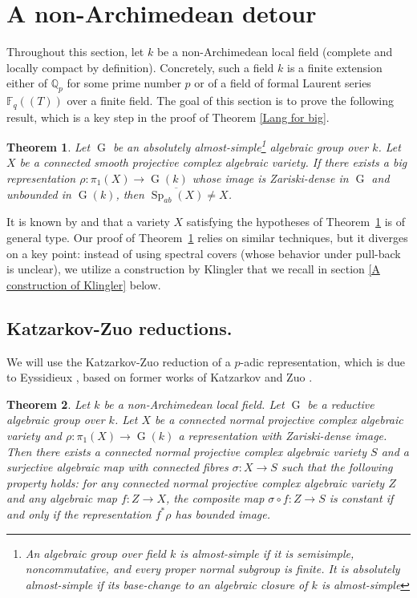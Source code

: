 \documentclass[11pt,letterpaper]{amsart}
\def\bQ{\mathbb{Q}}
\theoremstyle{plain}
\newtheorem{thm}{Theorem}[section]
\DeclareMathOperator{\Sp}{Sp}
\DeclareMathOperator{\rG}{G}
\begin{document}
\section{A non-Archimedean detour}

Throughout this section, let $k$ be a non-Archimedean local field (complete and locally compact by definition). Concretely, such a field $k$ is a finite extension either of $\bQ_p$ for some prime number $p$ or of a field of formal Laurent series $\mathbb{F}_q((T))$ over a finite field. The goal of this section is to prove the following result, which is a key step in the proof of Theorem \ref{Lang for big}.


\begin{thm}\label{non-Archimedean key}
Let $\rG$ be an absolutely almost-simple\footnote{An algebraic group over field $k$ is almost-simple if it is semisimple, noncommutative, and every proper normal subgroup is finite. It is absolutely almost-simple if its base-change to an algebraic closure of $k$ is almost-simple} algebraic group over $k$. Let $X$ be a connected smooth projective complex algebraic variety. If there exists a big representation $\rho \colon \pi_1(X) \rightarrow \rG(k)$ whose image is Zariski-dense in $\rG$ and unbounded in $\rG(k)$, then $\overline{\Sp_{ab}(X)} \neq X$.
\end{thm}

It is known by \cite[Theorem 1]{Zuo-Chern-hyperbolicity} and \cite[Theorem 6.3]{CCE} that a variety $X$ satisfying the hypotheses of Theorem~\ref{non-Archimedean key} is of general type. Our proof of Theorem~\ref{non-Archimedean key} relies on similar techniques, but it diverges on a key point: instead of using spectral covers (whose behavior under pull-back is unclear), we utilize a construction by Klingler that we recall in section \ref{A construction of Klingler} below.

\subsection{Katzarkov-Zuo reductions.}
We will use the Katzarkov-Zuo reduction of a $p$-adic representation, which is due to Eyssidieux \cite[Proposition 1.4.7]{Eyssidieux-reductive}, based on former works of Katzarkov and Zuo \cite{Katzarkov, Zuo-Chern-hyperbolicity, Zuo-book}.

\begin{thm}
Let $k$ be a non-Archimedean local field. Let $\rG$ be a reductive algebraic group over $k$. Let $X$ be a connected normal projective complex algebraic variety and $\rho \colon  \pi_1(X) \rightarrow \rG(k)$ a representation with Zariski-dense image. Then there exists a connected normal projective complex algebraic variety $S$ and a surjective algebraic map with connected fibres $\sigma \colon X \rightarrow S$ such that the following property holds: for any connected normal projective complex algebraic variety $Z$ and any algebraic map $f \colon Z \rightarrow X$, the composite map $\sigma \circ f \colon Z \rightarrow S$ is constant if and only if the representation $f^\ast \rho$ has bounded image.
\end{thm}
\end{document}
